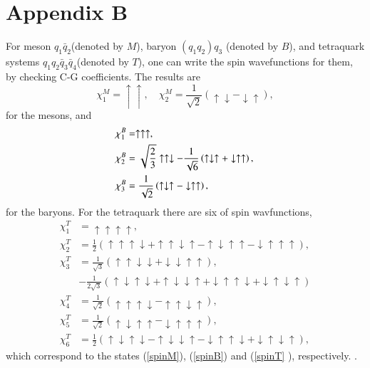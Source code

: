 \documentclass[prd,twocolumn,floatfix,nofootinbib]{revtex4}
\begin{document}
\section*{Appendix B}

\label{AppendixB} \setcounter{equation}{0} \renewcommand{\theequation}{B%
\arabic{equation}} For meson $q_{1}\bar{q}_{2}$(denoted by $M$), baryon $%
(q_{1}q_{2})q_{3}$ (denoted by $B$), and tetraquark systems $q_{1}q_{2}\bar{q%
}_{3}\bar{q}_{4}$(denoted by $T$), one can write the spin wavefunctions for
them, by checking C-G coefficients. The results are
\begin{equation}
\chi _{1}^{M}=\uparrow \uparrow ,\quad \chi _{2}^{M}=\frac{1}{\sqrt{2}}%
\left( \uparrow \downarrow -\downarrow \uparrow \right) ,  \label{pspinM}
\end{equation}%
for the mesons, and
\begin{equation}
\begin{aligned} \chi_{1}^{B}&=\uparrow\uparrow\uparrow, \\
\chi_{2}^{B}&=\sqrt{\frac{2}{3}}\uparrow\uparrow\downarrow-\frac{1}{%
\sqrt{6}}
\left(\uparrow\downarrow\uparrow+\downarrow\uparrow\uparrow\right), \\
\chi_{3}^{B}&=\frac{1}{\sqrt{2}}
\left(\uparrow\downarrow\uparrow-\downarrow\uparrow\uparrow\right),
\end{aligned}  \label{pspinB}
\end{equation}%
for the baryons. For the tetraquark there are six of spin wavfunctions,
\begin{equation}
\begin{aligned} \chi_{1}^{T}&=\uparrow\uparrow\uparrow\uparrow, \\
\chi_{2}^{T}&=\frac{1}{2}
\left(\uparrow\uparrow\uparrow\downarrow+\uparrow\uparrow\downarrow\uparrow-%
\uparrow\downarrow\uparrow\uparrow-\downarrow\uparrow\uparrow\uparrow%
\right), \\ \chi_{3}^{T}&=\frac{1}{\sqrt{3}}
\left(\uparrow\uparrow\downarrow\downarrow+\downarrow\downarrow\uparrow%
\uparrow\right), \\ &-\frac{1}{2\sqrt{3}}
\left(\uparrow\downarrow\uparrow\downarrow+\uparrow\downarrow\downarrow%
\uparrow+\downarrow\uparrow\uparrow\downarrow+\downarrow\uparrow\downarrow%
\uparrow\right) \\ \chi_{4}^{T}&=\frac{1}{\sqrt{2}}
\left(\uparrow\uparrow\uparrow\downarrow-\uparrow\uparrow\downarrow\uparrow%
\right), \\ \chi_{5}^{T}&=\frac{1}{\sqrt{2}}
\left(\uparrow\downarrow\uparrow\uparrow-\downarrow\uparrow\uparrow\uparrow%
\right), \\ \chi_{6}^{T}&=\frac{1}{2}
\left(\uparrow\downarrow\uparrow\downarrow-\uparrow\downarrow\downarrow%
\uparrow-\downarrow\uparrow\uparrow\downarrow+\downarrow\uparrow\downarrow%
\uparrow\right), \end{aligned}  \label{pspinT}
\end{equation}%
which correspond to the states (\ref{spinM}), (\ref{spinB}) and (\ref{spinT}%
), respectively. .
\end{document}

